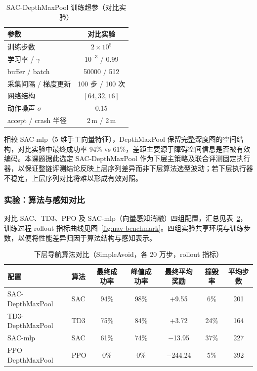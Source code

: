 \begin{table}[htbp]
  \centering
  \caption{SAC-DepthMaxPool 训练超参（对比实验）}
  \label{tab:sac-hparam}
  \begin{tabular}{lc}
    \toprule
    参数 & 对比实验 \\
    \midrule
    训练步数 & $2\times10^5$ \\
    学习率 / $\gamma$ & $10^{-3}$ / 0.99 \\
    buffer / batch & 50000 / 512 \\
    采集间隔 / 梯度更新 & 100 步 / 100 次 \\
    网络结构 & $[64,32,16]$ \\
    动作噪声 $\sigma$ & 0.15 \\
    accept / crash 半径 & 2\,m / 2\,m \\
    \bottomrule
  \end{tabular}
\end{table}

相较 SAC-mlp（5 维手工向量特征），DepthMaxPool 保留完整深度图的空间结构，对比实验中最终成功率 94\% vs 61\%，差距主要源于障碍空间信息是否被有效编码。本课题据此选定 SAC-DepthMaxPool 作为下层主策略及联合评测固定执行器，以保证整链评测结论反映上层序列差异而非下层算法选型波动；若下层执行器不稳定，上层序列对比将难以形成有效对照。

\subsubsection{实验：算法与感知对比}

对比 SAC、TD3、PPO 及 SAC-mlp（向量感知消融）四组配置，汇总见表~\ref{tab:nav-benchmark}，训练过程 rollout 指标曲线见图~\ref{fig:nav-benchmark}。四组实验共享环境与训练步数，以便将性能差异归因于算法结构与感知表示。

\begin{table}[htbp]
  \centering
  \caption{下层导航算法对比（SimpleAvoid，各 20 万步，rollout 指标）}
  \label{tab:nav-benchmark}
  \begin{tabular}{llccccc}
    \toprule
    配置 & 算法 & 最终成功率 & 峰值成功率 & 最终平均奖励 & 撞毁率 & 平均步数 \\
    \midrule
    SAC-DepthMaxPool & SAC & 94\% & 98\% & +9.55 & 6\% & 201 \\
    TD3-DepthMaxPool & TD3 & 75\% & 84\% & +3.72 & 24\% & 164 \\
    SAC-mlp     & SAC & 61\% & 74\% & $-$13.95 & 37\% & 227 \\
    PPO-DepthMaxPool & PPO & 0\%  & 0\%  & $-$244.24 & 5\% & 392 \\
    \bottomrule
  \end{tabular}
\end{table}

